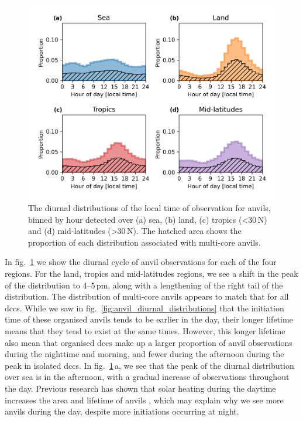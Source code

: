 \begin{figure}[tp]
    \centering
    \includegraphics[width=\textwidth]{figures/chapter2_26.png}
    \caption[
    The diurnal distributions of the local time of observation for anvils detected over sea, land, tropics and mid-latitudes
    ]{
    The diurnal distributions of the local time of observation for anvils, binned by hour detected over (a) sea, (b) land, (c) tropics (\textless 30\,\textdegree N) and (d) mid-latitudes (\textgreater 30\,\textdegree N). The hatched area shows the proportion of each distribution associated with multi-core anvils.
    }
    \label{fig:anvil_diurnal_obs_distributions}
\end{figure}

In fig.~\ref{fig:anvil_diurnal_obs_distributions} we show the diurnal cycle of anvil observations for each of the four regions.
For the land, tropics and mid-latitudes regions, we see a shift in the peak of the distribution to 4--5\,pm, along with a lengthening of the right tail of the distribution.
The distribution of multi-core anvils appears to match that for all \acrshort{dcc}s.
While we saw in fig.~\ref{fig:anvil_diurnal_distributions} that the initiation time of these organised anvils tends to be earlier in the day, their longer lifetime means that they tend to exist at the same times.
However, this longer lifetime also mean that organised \acrshort{dcc}s make up a larger proportion of anvil observations during the nighttime and morning, and fewer during the afternoon during the peak in isolated \acrshort{dcc}s.
In fig.~\ref{fig:anvil_diurnal_obs_distributions}\,a, we see that the peak of the diurnal distribution over sea is in the afternoon, with a gradual increase of observations throughout the day.
Previous research has shown that solar heating during the daytime increases the area and lifetime of anvils \citep{gasparini_diurnal_2022}, which may explain why we see more anvils during the day, despite more initiations occurring at night.

